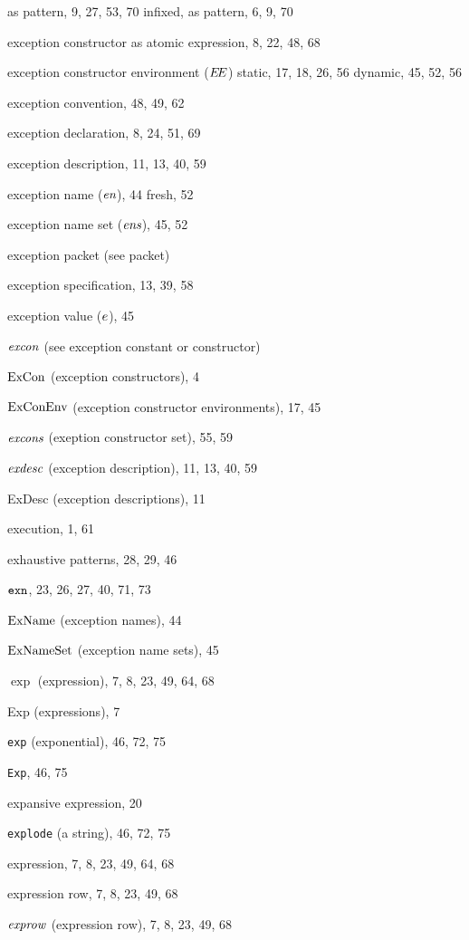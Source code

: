 \begin{theindex}
\subitem as pattern, 9, 27, 53, 70
\subitem infixed, as pattern, 6, 9, 70
\item exception constructor 
\subitem as atomic expression, 8, 22, 48, 68
\item exception constructor environment ($\mbox{$E\!E$}$) 
\subitem static, 17, 18, 26, 56
\subitem dynamic, 45, 52, 56
\item exception convention, 48, 49, 62
\item exception declaration, 8, 24, 51, 69
\item exception description, 11, 13, 40, 59
\item exception name ($\mbox{\it en}$), 44
\subitem fresh, 52
\item exception name set ($\mbox{\it ens}$), 45, 52
\item exception packet (see packet) 
\item exception specification, 13, 39, 58
\item exception value ($e$), 45
\item ${\it excon}$ (see exception constant or constructor) 
\item ${\rm ExCon}$ (exception constructors), 4
\item ${\rm ExConEnv}$ (exception constructor environments), 17, 45
\item $\mbox{\it excons}$ (exeption constructor set), 55, 59
\item ${\it exdesc}$ (exception description), 11, 13, 40, 59
\item ExDesc (exception descriptions), 11
\item execution, 1, 61
\item exhaustive patterns, 28, 29, 46
\item $\mbox{\tt exn}$, 23, 26, 27, 40, 71, 73
\item ${\rm ExName}$ (exception names), 44
\item ${\rm ExNameSet}$ (exception name sets), 45
\item $\exp$ (expression), 7, 8, 23, 49, 64, 68
\item Exp (expressions), 7
\item {\tt exp} (exponential), 46, 72, 75
\item {\tt Exp}, 46, 75
\item expansive expression, 20
\item {\tt explode} (a string), 46, 72, 75
\item expression, 7, 8, 23, 49, 64, 68
\item expression row, 7, 8, 23, 49, 68
\item ${\it exprow}$ (expression row), 7, 8, 23, 49, 68

\end{theindex}
